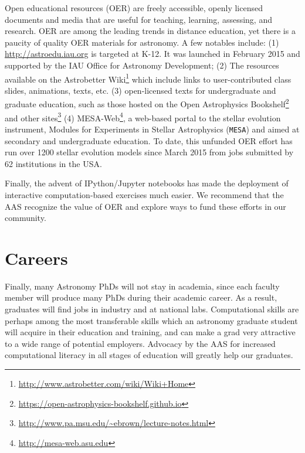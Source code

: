 \documentclass[11pt]{article}
\begin{document}
Open educational resources (OER) are freely accessible, openly
licensed documents and media that are useful for teaching, learning,
assessing, and research. OER are among the leading trends in distance
education, yet there is a paucity of quality OER materials for
astronomy. A few notables include: (1)
\href{http://astroedu.iau.org}{http://astroedu.iau.org} is targeted
at K-12. It was launched in February 2015 and supported by the IAU
Office for Astronomy Development; (2) The resources available on the
Astrobetter
Wiki\footnote{\url{http://www.astrobetter.com/wiki/Wiki+Home}} which
include links to user-contributed class slides, animations, texts,
etc. (3) open-licensed texts for undergraduate and graduate education,
such as those hosted on the Open Astrophysics
Bookshelf\footnote{\url{https://open-astrophysics-bookshelf.github.io}}
and other
sites\footnote{\url{http://www.pa.msu.edu/~ebrown/lecture-notes.html}}
(4) MESA-Web\footnote{\url{http://mesa-web.asu.edu}}, a
web-based portal to the stellar evolution instrument, Modules for
Experiments in Stellar Astrophysics ({\tt MESA}) and aimed at
secondary and undergraduate education. To date, this unfunded OER
effort has run over 1200 stellar evolution models since March 2015
from jobs submitted by 62 institutions in the USA.

Finally, the advent of IPython/Jupyter notebooks has made the
deployment of interactive computation-based exercises much easier.  We
recommend that the AAS recognize the value of OER and explore ways to
fund these efforts in our community.

\section{Careers}

Finally, many Astronomy PhDs will not stay in academia, since each
faculty member will produce many PhDs during their academic career.
As a result, graduates will find jobs in industry and at national
labs. Computational skills are perhaps among the most transferable
skills which an astronomy graduate student will acquire in their
education and training, and can make a grad very attractive to a wide
range of potential employers.  Advocacy by the AAS for increased
computational literacy in all stages of education will greatly help
our graduates.
\end{document}
